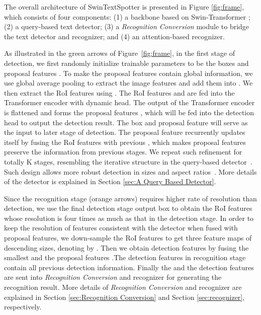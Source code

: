 \documentclass[10pt,twocolumn,letterpaper]{article}
\begin{document}
The overall architecture of SwinTextSpotter is presented in Figure \ref{fig:frame}, which consists of four components: 
(1) a backbone based on Swin-Transformer \cite{liu2021Swin};
(2) a query-based text detector; 
(3) a \textit{Recognition Conversion} module to bridge the text detector and recognizer; and 
(4) an attention-based recognizer. 

As illustrated in the green arrows of Figure~\ref{fig:frame}, in the first stage of detection, we first randomly initialize trainable parameters to be the boxes  and proposal features . To make the proposal features contain global information, we use global average pooling to extract the image features and add them into .
We then extract the RoI features using . 
The RoI features and  are fed into the Transformer encoder with dynamic head.
The output of the Transformer encoder is flattened and forms the proposal features , which will be fed into the detection head to output the detection result. 
The box  and proposal feature  will serve as the input to later  stage of detection. 
The proposal feature  recurrently updates itself by fusing the RoI features with previous , which makes proposal features preserve the information from previous stages. 
We repeat such refinement for totally K stages, resembling the iterative structure in the query-based detector~\cite{carion2020end,zhu2020deformable,sun2021sparse,hu2021istr}.
Such design allows more robust detection in sizes and aspect ratios~\cite{sun2021sparse}. 
More details of the detector is explained in Section \ref{sec:A Query Based Detector}.


Since the recognition stage (orange arrows) requires higher rate of resolution than detection, we use the final detection stage output box  to obtain the RoI features whose resolution is four times as much as that in the detection stage. 
In order to keep the resolution of features consistent with the detector when fused with proposal features, we down-sample the RoI features to get three feature maps of descending sizes, denoting by . 
Then we obtain detection features  by fusing the smallest  and the proposal features .The detection features  in recognition stage contain all previous detection information. Finally the  and the detection features  are sent into \textit{Recognition Conversion} and recognizer for generating the recognition result.
More details of \textit{Recognition Conversion} and recognizer are explained in Section \ref{sec:Recognition Conversion} and Section \ref{sec:recognizer}, respectively.
\end{document}

